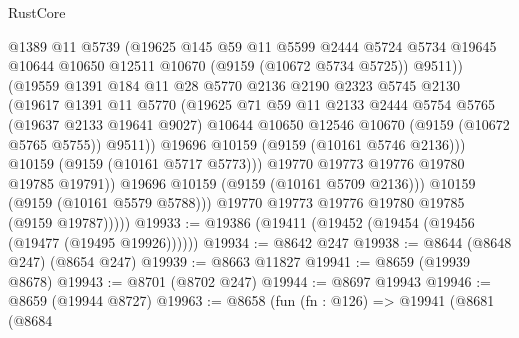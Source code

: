 \begin{lexlean}{RustCore}
\begin{coremodule}
                        @1389
                        @11
                        @5739
                        (@19625
                          @145
                          @59
                          @11
                          @5599
                          @2444
                          @5724
                          @5734
                          @19645
                          @10644
                          @10650
                          @12511
                          @10670
                          (@9159 (@10672 @5734 @5725))
                          @9511))
                      (@19559
                        @1391
                        @184
                        @11
                        @28
                        @5770
                        @2136
                        @2190
                        @2323
                        @5745
                        @2130
                        (@19617
                          @1391
                          @11
                          @5770
                          (@19625
                            @71
                            @59
                            @11
                            @2133
                            @2444
                            @5754
                            @5765
                            (@19637 @2133 @19641 @9027)
                            @10644
                            @10650
                            @12546
                            @10670
                            (@9159 (@10672 @5765 @5755))
                            @9511))
                        @19696
                        @10159
                        (@9159 (@10161 @5746 @2136)))
                      @10159
                      (@9159 (@10161 @5717 @5773)))
                    @19770
                    @19773
                    @19776
                    @19780
                    @19785
                    @19791))
                @19696
                @10159
                (@9159 (@10161 @5709 @2136)))
              @10159
              (@9159 (@10161 @5579 @5788)))
            @19770
            @19773
            @19776
            @19780
            @19785
            (@9159 @19787)))))
@19933 := @19386 (@19411 (@19452 (@19454 (@19456 (@19477 (@19495 @19926))))))
@19934 := @8642 @247
@19938 := @8644 (@8648 @247) (@8654 @247)
@19939 := @8663 @11827
@19941 := @8659 (@19939 @8678)
@19943 := @8701 (@8702 @247)
@19944 := @8697 @19943
@19946 := @8659 (@19944 @8727)
@19963 := @8658
    (fun (fn : @126) =>
    @19941
      (@8681
        (@8684

\end{coremodule}
\end{lexlean}
